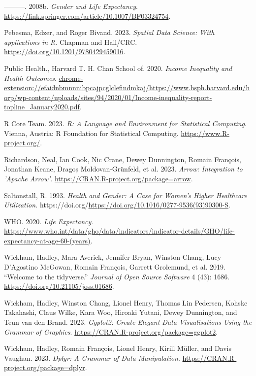 \documentclass[
  letterpaper,
  DIV=11,
  numbers=noendperiod]{scrartcl}
\newlength{\cslhangindent}
\newenvironment{CSLReferences}[2] %
 {\begin{list}{}{%
  \setlength{\itemindent}{0pt}
  \setlength{\leftmargin}{0pt}
  \setlength{\parsep}{0pt}
  \ifodd #1
   \setlength{\leftmargin}{\cslhangindent}
   \setlength{\itemindent}{-1\cslhangindent}
  \fi
  \setlength{\itemsep}{#2\baselineskip}}}
 {\end{list}}
\begin{document}
\begin{CSLReferences}{1}{0}
---------. 2008b. \emph{Gender and Life Expectancy}.
\url{https://link.springer.com/article/10.1007/BF03324754}.

Pebesma, Edzer, and Roger Bivand. 2023. \emph{{Spatial Data Science:
With applications in R}}. {Chapman and Hall/CRC}.
\url{https://doi.org/10.1201/9780429459016}.

Public Health., Harvard T. H. Chan School of. 2020. \emph{Income
Inequality and Health Outcomes}.
\url{chrome-extension://efaidnbmnnnibpcajpcglclefindmkaj/https://www.hsph.harvard.edu/horp/wp-content/uploads/sites/94/2020/01/Income-inequality-report-topline_January2020.pdf}.

R Core Team. 2023. \emph{{R: A Language and Environment for Statistical
Computing}}. Vienna, Austria: R Foundation for Statistical Computing.
\url{https://www.R-project.org/}.

Richardson, Neal, Ian Cook, Nic Crane, Dewey Dunnington, Romain
François, Jonathan Keane, Dragoș Moldovan-Grünfeld, et al. 2023.
\emph{Arrow: Integration to 'Apache Arrow'}.
\url{https://CRAN.R-project.org/package=arrow}.

Saltonstall, R. 1993. \emph{Health and Gender: A Case for Women's Higher
Healthcare Utilization.}
https://doi.org/\url{https://doi.org/10.1016/0277-9536(93)90300-S}.

WHO. 2020. \emph{Life Expectancy}.
\url{https://www.who.int/data/gho/data/indicators/indicator-details/GHO/life-expectancy-at-age-60-(years)}.

Wickham, Hadley, Mara Averick, Jennifer Bryan, Winston Chang, Lucy
D'Agostino McGowan, Romain François, Garrett Grolemund, et al. 2019.
{``Welcome to the {tidyverse}.''} \emph{Journal of Open Source Software}
4 (43): 1686. \url{https://doi.org/10.21105/joss.01686}.

Wickham, Hadley, Winston Chang, Lionel Henry, Thomas Lin Pedersen,
Kohske Takahashi, Claus Wilke, Kara Woo, Hiroaki Yutani, Dewey
Dunnington, and Teun van den Brand. 2023. \emph{Ggplot2: Create Elegant
Data Visualisations Using the Grammar of Graphics}.
\url{https://CRAN.R-project.org/package=ggplot2}.

Wickham, Hadley, Romain François, Lionel Henry, Kirill Müller, and Davis
Vaughan. 2023. \emph{Dplyr: A Grammar of Data Manipulation}.
\url{https://CRAN.R-project.org/package=dplyr}.


\end{CSLReferences}
\end{document}
